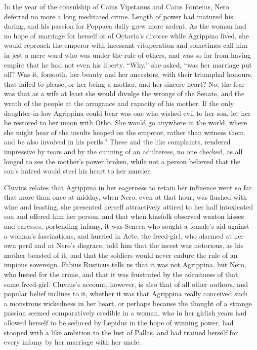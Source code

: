 
In the year of the consulship of Caius Vipstanus and Caius Fonteius, Nero deferred no more a long meditated crime. Length of power had matured his daring, and his passion for Poppaea daily grew more ardent. As the woman had no hope of marriage for herself or of Octavia's divorce while Agrippina lived, she would reproach the emperor with incessant vituperation and sometimes call him in jest a mere ward who was under the rule of others, and was so far from having empire that he had not even his liberty. ``Why,'' she asked, ``was her marriage put off? Was it, forsooth, her beauty and her ancestors, with their triumphal honours, that failed to please, or her being a mother, and her sincere heart? No; the fear was that as a wife at least she would divulge the wrongs of the Senate, and the wrath of the people at the arrogance and rapacity of his mother. If the only daughter-in-law Agrippina could bear was one who wished evil to her son, let her be restored to her union with Otho. She would go anywhere in the world, where she might hear of the insults heaped on the emperor, rather than witness them, and be also involved in his perils.'' These and the like complaints, rendered impressive by tears and by the cunning of an adulteress, no one checked, as all longed to see the mother's power broken, while not a person believed that the son's hatred would steel his heart to her murder.


Cluvius relates that Agrippina in her eagerness to retain her influence went so far that more than once at midday, when Nero, even at that hour, was flushed with wine and feasting, she presented herself attractively attired to her half intoxicated son and offered him her person, and that when kinsfolk observed wanton kisses and caresses, portending infamy, it was Seneca who sought a female's aid against a woman's fascinations, and hurried in Acte, the freed-girl, who alarmed at her own peril and at Nero's disgrace, told him that the incest was notorious, as his mother boasted of it, and that the soldiers would never endure the rule of an impious sovereign. Fabius Rusticus tells us that it was not Agrippina, but Nero, who lusted for the crime, and that it was frustrated by the adroitness of that same freed-girl. Cluvius's account, however, is also that of all other authors, and popular belief inclines to it, whether it was that Agrippina really conceived such a monstrous wickedness in her heart, or perhaps because the thought of a strange passion seemed comparatively credible in a woman, who in her girlish years had allowed herself to be seduced by Lepidus in the hope of winning power, had stooped with a like ambition to the lust of Pallas, and had trained herself for every infamy by her marriage with her uncle.

